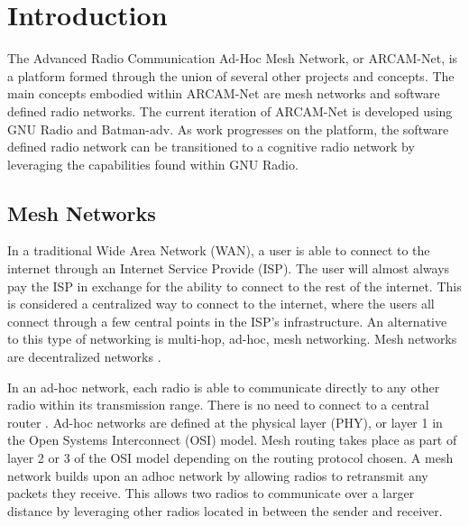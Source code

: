 
\chapter{Introduction} %

\label{Chapter1} %

The Advanced Radio Communication Ad-Hoc Mesh Network, or ARCAM-Net, is a platform formed through the union of several other projects and concepts. The main concepts embodied within ARCAM-Net are mesh networks and software defined radio networks. The current iteration of ARCAM-Net is developed using GNU Radio and Batman-adv. As work progresses on the platform, the software defined radio network can be transitioned to a cognitive radio network by leveraging the capabilities found within GNU Radio. 


\newcommand{\keyword}[1]{\textbf{#1}}
\newcommand{\tabhead}[1]{\textbf{#1}}
\newcommand{\code}[1]{\texttt{#1}}
\newcommand{\file}[1]{\texttt{\bfseries#1}}
\newcommand{\option}[1]{\texttt{\itshape#1}}


\section{Mesh Networks}

In a traditional Wide Area Network (WAN), a user is able to connect to the internet through an Internet Service Provide (ISP). The user will almost always pay the ISP in exchange for the ability to connect to the rest of the internet. This is considered a centralized way to connect to the internet, where the users all connect through a few central points in the ISP's infrastructure. An alternative to this type of networking is multi-hop, ad-hoc, mesh networking. Mesh networks are decentralized networks \cite{4796928}. 

In an ad-hoc network, each radio is able to communicate directly to any other radio within its transmission range. There is no need to connect to a central router \cite{4796928}. Ad-hoc networks are defined at the physical layer (PHY), or layer 1 in the Open Systems Interconnect (OSI) model. Mesh routing takes place as part of layer 2 or 3 of the OSI model depending on the routing protocol chosen. A mesh network builds upon an adhoc network by allowing radios to retransmit any packets they receive. This allows two radios to communicate over a larger distance by leveraging other radios located in between the sender and receiver\cite{0033}. 

